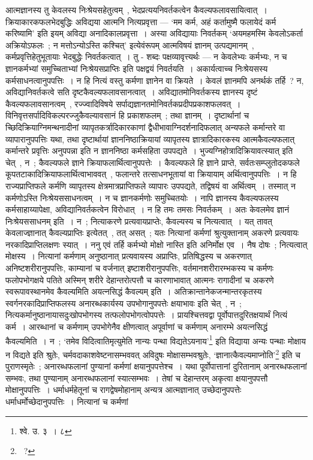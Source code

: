 आत्मज्ञानस्य तु केवलस्य निःश्रेयसहेतुत्वम्~, भेदप्रत्ययनिवर्तकत्वेन कैवल्यफलावसायित्वात्~। क्रियाकारकफलभेदबुद्धिः अविद्यया आत्मनि नित्यप्रवृत्ता — ‘मम कर्म, अहं कर्तामुष्मै फलायेदं कर्म करिष्यामि’ इति इयम् अविद्या अनादिकालप्रवृत्ता~। अस्या अविद्यायाः निवर्तकम् ‘अयमहमस्मि केवलोऽकर्ता अक्रियोऽफलः~; न मत्तोऽन्योऽस्ति कश्चित्’ इत्येवंरूपम् आत्मविषयं ज्ञानम् उत्पद्यमानम्~, कर्मप्रवृत्तिहेतुभूतायाः भेदबुद्धेः निवर्तकत्वात्~। तु - शब्दः पक्षव्यावृत्त्यर्थः — न केवलेभ्यः कर्मभ्यः, न च ज्ञानकर्मभ्यां समुच्चिताभ्यां निःश्रेयसप्राप्तिः इति पक्षद्वयं निवर्तयति~। अकार्यत्वाच्च निःश्रेयसस्य कर्मसाधनत्वानुपपत्तिः~। न हि नित्यं वस्तु कर्मणा ज्ञानेन वा क्रियते~। केवलं ज्ञानमपि अनर्थकं तर्हि~? न, अविद्यानिवर्तकत्वे सति दृष्टकैवल्यफलावसानत्वात्~। अविद्यातमोनिवर्तकस्य ज्ञानस्य दृष्टं कैवल्यफलावसानत्वम्~, रज्ज्वादिविषये सर्पाद्यज्ञानतमोनिवर्तकप्रदीपप्रकाशफलवत्~। विनिवृत्तसर्पादिविकल्परज्जुकैवल्यावसानं हि प्रकाशफलम्~; तथा ज्ञानम्~। दृष्टार्थानां च च्छिदिक्रियाग्निमन्थनादीनां व्यापृतकर्त्रादिकारकाणां द्वैधीभावाग्निदर्शनादिफलात् अन्यफले कर्मान्तरे वा व्यापारानुपपत्तिः यथा, तथा दृष्टार्थायां ज्ञाननिष्ठाक्रियायां व्यापृतस्य ज्ञात्रादिकारकस्य आत्मकैवल्यफलात् कर्मान्तरे प्रवृत्तिः अनुपपन्ना इति न ज्ञाननिष्ठा कर्मसहिता उपपद्यते~। भुज्यग्निहोत्रादिक्रियावत्स्यात् इति चेत्~, न~; कैवल्यफले ज्ञाने क्रियाफलार्थित्वानुपपत्तेः~। कैवल्यफले हि ज्ञाने प्राप्ते, सर्वतःसम्प्लुतोदकफले कूपतटाकादिक्रियाफलार्थित्वाभाववत्~, फलान्तरे तत्साधनभूतायां वा क्रियायाम् अर्थित्वानुपपत्तिः~। न हि राज्यप्राप्तिफले कर्मणि व्यापृतस्य क्षेत्रमात्रप्राप्तिफले व्यापारः उपपद्यते, तद्विषयं वा अर्थित्वम्~। तस्मात् न कर्मणोऽस्ति निःश्रेयससाधनत्वम्~। न च ज्ञानकर्मणोः समुच्चितयोः~। नापि ज्ञानस्य कैवल्यफलस्य कर्मसाहाय्यापेक्षा, अविद्यानिवर्तकत्वेन विरोधात्~। न हि तमः तमसः निवर्तकम्~। अतः केवलमेव ज्ञानं निःश्रेयससाधनम् इति~। न~; नित्याकरणे प्रत्यवायप्राप्तेः, कैवल्यस्य च नित्यत्वात्~। यत् तावत् केवलाज्ज्ञानात् कैवल्यप्राप्तिः इत्येतत्~, तत् असत्~; यतः नित्यानां कर्मणां श्रुत्युक्तानाम् अकरणे प्रत्यवायः नरकादिप्राप्तिलक्षणः स्यात्~। ननु एवं तर्हि कर्मभ्यो मोक्षो नास्ति इति अनिर्मोक्ष एव~। नैष दोषः~; नित्यत्वात् मोक्षस्य~। नित्यानां कर्मणाम् अनुष्ठानात् प्रत्यवायस्य अप्राप्तिः, प्रतिषिद्धस्य च अकरणात् अनिष्टशरीरानुपपत्तिः, काम्यानां च वर्जनात् इष्टाशरीरानुपपत्तिः, वर्तमानशरीरारम्भकस्य च कर्मणः फलोपभोगक्षये पतिते अस्मिन् शरीरे देहान्तरोत्पत्तौ च कारणाभावात् आत्मनः रागादीनां च अकरणे स्वरूपावस्थानमेव कैवल्यमिति अयत्नसिद्धं कैवल्यम् इति~। अतिक्रान्तानेकजन्मान्तरकृतस्य स्वर्गनरकादिप्राप्तिफलस्य अनारब्धकार्यस्य उपभोगानुपपत्तेः क्षयाभावः इति चेत्~, न~; नित्यकर्मानुष्ठानायासदुःखोपभोगस्य तत्फलोपभोगत्वोपपत्तेः~। प्रायश्चित्तवद्वा पूर्वोपात्तदुरितक्षयार्थं नित्यं कर्म~। आरब्धानां च कर्मणाम् उपभोगेनैव क्षीणत्वात् अपूर्वाणां च कर्मणाम् अनारम्भे अयत्नसिद्धं कैवल्यमिति~। न~; ‘तमेव विदित्वातिमृत्युमेति नान्यः पन्था विद्यतेऽयनाय’\footnote{श्वे. उ. ३~। ८} इति विद्याया अन्यः पन्थाः मोक्षाय न विद्यते इति श्रुतेः, चर्मवदाकाशवेष्टनासम्भववत् अविदुषः मोक्षासम्भवश्रुतेः, ‘ज्ञानात्कैवल्यमाप्नोति’\footnote{~? } इति च पुराणस्मृतेः~; अनारब्धफलानां पुण्यानां कर्मणां क्षयानुपपत्तेश्च~। यथा पूर्वोपात्तानां दुरितानाम् अनारब्धफलानां सम्भवः, तथा पुण्यानाम् अनारब्धफलानां स्यात्सम्भवः~। तेषां च देहान्तरम् अकृत्वा क्षयानुपपत्तौ मोक्षानुपपत्तिः~। धर्माधर्महेतूनां च रागद्वेषमोहानाम् अन्यत्र आत्मज्ञानात् उच्छेदानुपपत्तेः धर्माधर्मोच्छेदानुपपत्तिः~। नित्यानां च कर्मणां 